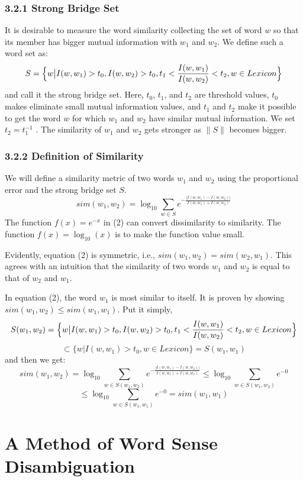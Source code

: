 \subsubsection{3.2.1   Strong Bridge Set}

It is desirable to measure the word similarity collecting the set
 of word $w$ so that its member has bigger mutual information 
with $w_1$  and $w_2$.  We define such a word set as:
\[S=\Bigl\{w \bigl| I(w,w_1)>t_0, I(w,w_2)>t_0, t_1<\frac{I(w,w_1)}{I(w,w_2)}<t_2, w\in Lexicon \Bigl\}\]
and call it the strong bridge set.  Here, $t_0$, $t_1$, and $t_2$ are 
threshold values,  $t_0$ makes eliminate small mutual information
 values, and $t_1$ and $t_2$ make it possible to get the word $w$ for 
which $w_1$  and $w_2$ have similar mutual information.  We set $t_2=t_1^{-1}$ .  The 
similarity of $w_1$  and $w_2$ gets stronger as $\|S\|$  becomes bigger.

\subsubsection{3.2.2   Definition of Similarity}

We will define a similarity metric of two words $w_1$  and $w_2$ using
 the proportional error and the strong bridge set $S$.
\begin{equation}
sim(w_1,w_2)=\log_{10}\sum_{w \in S}e^{-\frac{| I(w,w_1)-I(w,w_2) |}{I(w,w_1)+I(w,w_2)}}
\end{equation}
The function $f(x)=e^{-x}$ in (2) can convert dissimilarity to similarity.  
The function $f(x)=\log_{10}(x)$ is to make the function value small.


Evidently, equation (2) is symmetric, i.e., $sim(w_1,w_2)=sim(w_2,w_1)$.  This agrees
 with an intuition that the similarity of two
 words $w_1$  and $w_2$ is equal to that of $w_2$ and $w_1$.


In equation (2), the word $w_1$ is most similar to itself.  
It is proven by showing $sim(w_1,w_2) \leq sim(w_1,w_1)$.  Put it simply,
\[S(w_1,w_2)=\Bigl\{w \bigl| I(w,w_1)>t_0, I(w,w_2)>t_0, t_1<\frac{I(w,w_1)}{I(w,w_2)}<t_2,
 w\in Lexicon \Bigl\}\] 
\[\subset\{w| I(w,w_1)>t_0, w\in Lexicon\}=S(w_1,w_1)\]
and then we get:
\[sim(w_1,w_2)=\log_{10}\sum_{w \in S(w_1,w_2)}e^{-\frac{| I(w,w_1)-I(w,w_2) |}{I(w,w_1)+I(w,w_2)}} \leq 
\log_{10}\sum_{w \in S(w_1,w_2)}e^{-0}\]
\[\leq \log_{10}\sum_{w \in S(w_1,w_1)}e^{-0}=sim(w_1,w_1)\]

\section{A Method of Word Sense Disambiguation}

